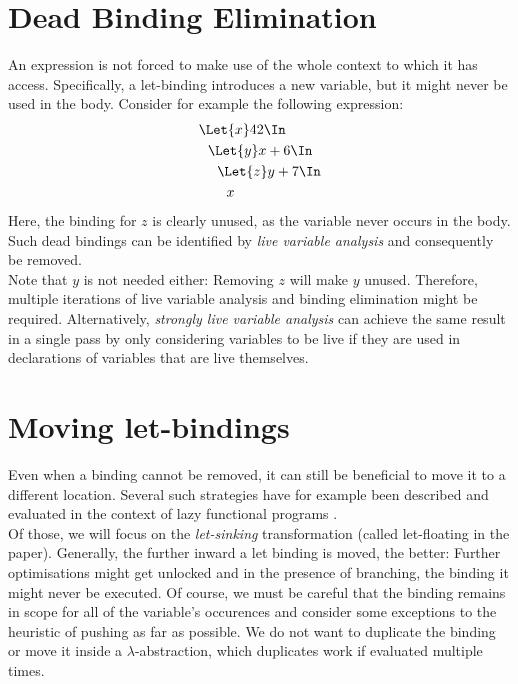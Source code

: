 \section{Dead Binding Elimination}
\label{sec:program-transformations-dbe}
An expression is not forced to make use of the whole context to which it has access.
Specifically, a let-binding introduces a new variable, but it might never be used
in the body.
Consider for example the following expression:
\begin{align*}
  &\Let{x} 42 \In            \\
  &\ \ \Let{y} x + 6 \In     \\
  &\ \ \ \ \Let{z} y + 7 \In \\
  &\ \ \ \ \ \ x
\end{align*}
Here, the binding for $z$ is clearly unused, as the variable never occurs in the body.
Such dead bindings can be identified by \emph{live variable analysis}
and consequently be removed.
\\
Note that $y$ is not needed either: Removing $z$ will make $y$ unused.
Therefore, multiple iterations of live variable analysis and binding elimination might be required.
Alternatively, \emph{strongly live variable analysis} can achieve the same result in a single pass
by only considering variables to be live
if they are used in declarations of variables that are live themselves.


\section{Moving let-bindings}
\label{sec:program-transformations-let-sinking}
Even when a binding cannot be removed,
it can still be beneficial to move it to a different location.
Several such strategies have for example been described and evaluated
in the context of lazy functional programs
\cite{Jones1996LetFloating}.
\\
Of those, we will focus on the \emph{let-sinking} transformation
(called let-floating in the paper).
Generally, the further inward a let binding is moved, the better:
Further optimisations might get unlocked and in the presence of branching,
the binding it might never be executed.
Of course, we must be careful that the binding remains in scope
for all of the variable's occurences
and consider some exceptions to the heuristic of pushing as far as possible.
We do not want to duplicate the binding
or move it inside a $\lambda$-abstraction, which duplicates work
if evaluated multiple times.

\vspace{1cm}
